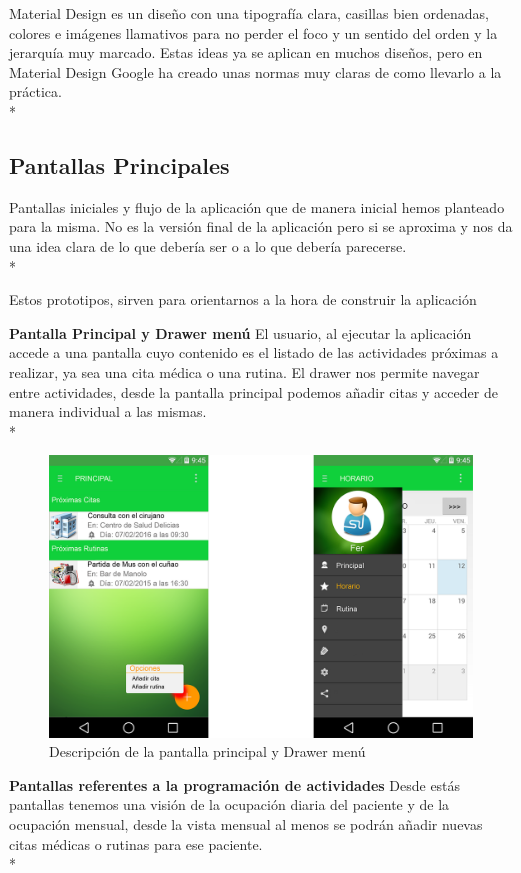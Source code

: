 \documentclass[../pfc.tex]{subfiles}
\begin{document}
		Material Design es un diseño con una tipografía clara, casillas bien ordenadas, colores e imágenes llamativos para no perder el foco y un sentido del orden y la jerarquía muy marcado. Estas ideas ya se aplican en muchos diseños, pero en Material Design Google ha creado unas normas muy claras de como llevarlo a la práctica.\\*
		
		\subsection{Pantallas Principales}
		
			Pantallas iniciales y flujo de la aplicación que de manera inicial hemos planteado para la misma.
			No es la versión final de la aplicación pero si se aproxima y nos da una idea clara de lo que debería ser o a lo que debería parecerse.\\*
			
			Estos prototipos, sirven para orientarnos a la hora de construir la aplicación
			
			\textbf{Pantalla Principal y Drawer menú}
			El usuario, al ejecutar la aplicación accede a una pantalla cuyo contenido es el listado de las actividades próximas a realizar, ya sea una cita médica o una rutina.
			El drawer nos permite navegar entre actividades, desde la pantalla principal podemos añadir citas y acceder de manera individual a las mismas.\\*
			 
			
			\begin{figure}[h]
				\centering
				\includegraphics[width=0.7\linewidth]{../images/principal_2}
				\caption[Drawer menú y Pantalla principal]{Descripción de la pantalla principal y Drawer menú}
				\label{fig:principal}
			\end{figure}
			
			
			\textbf{Pantallas referentes a la programación de actividades}
			Desde estás pantallas tenemos una visión de la ocupación diaria del paciente y de la ocupación mensual, desde la vista mensual al menos se podrán añadir nuevas citas médicas o rutinas para ese paciente.\\*
\end{document}
